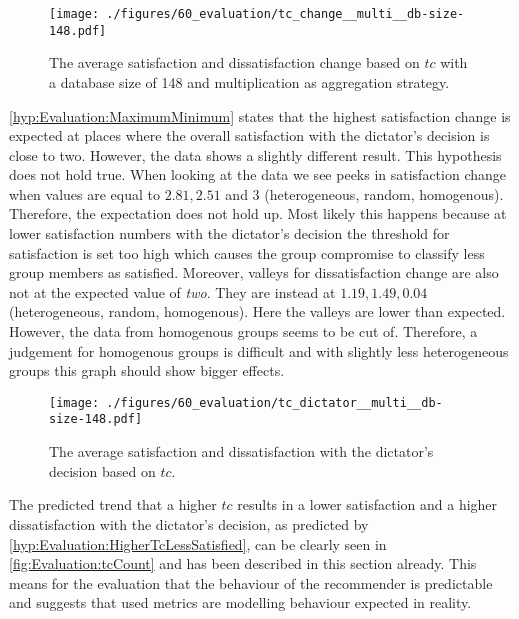 \begin{figure}
    \centering
    \texttt{[image: ./figures/60\_evaluation/tc\_change\_\_multi\_\_db-size-148.pdf]}
    \caption{The average satisfaction and dissatisfaction change based on $tc$ with a database size of 148 and multiplication as aggregation strategy.}
    \label{fig:Evaluation:tcChange}
\end{figure}

\autoref{hyp:Evaluation:MaximumMinimum} states that the highest satisfaction change is expected at places where the overall satisfaction with the dictator's decision is close to two. However, the data shows a slightly different result. This hypothesis does not hold true. When looking at the data we see peeks in satisfaction change when values are equal to $2.81, 2.51$ and $3$ (heterogeneous, random, homogenous). Therefore, the expectation does not hold up. Most likely this happens because at lower satisfaction numbers with the dictator's decision the threshold for satisfaction is set too high which causes the group compromise to classify less group members as satisfied. Moreover, valleys for dissatisfaction change are also not at the expected value of \textit{two}. They are instead at $1.19, 1.49, 0.04$ (heterogeneous, random, homogenous). Here the valleys are lower than expected. However, the data from homogenous groups seems to be cut of. Therefore, a judgement for homogenous groups is difficult and with slightly less heterogeneous groups this graph should show bigger effects.

\begin{figure}
    \centering
    \texttt{[image: ./figures/60\_evaluation/tc\_dictator\_\_multi\_\_db-size-148.pdf]}
    \caption{The average satisfaction and dissatisfaction with the dictator's decision based on $tc$.}
    \label{fig:Evaluation:tcCount}
\end{figure}

The predicted trend that a higher $tc$ results in a lower satisfaction and a higher dissatisfaction with the dictator's decision, as predicted by \autoref{hyp:Evaluation:HigherTcLessSatisfied}, can be clearly seen in \autoref{fig:Evaluation:tcCount} and has been described in this section already. This means for the evaluation that the behaviour of the recommender is predictable and suggests that used metrics are modelling behaviour expected in reality.

